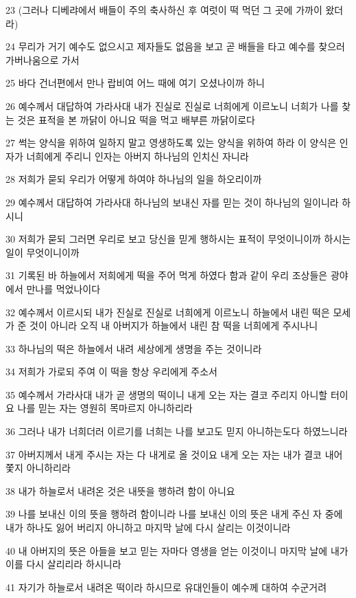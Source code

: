 \par 23 (그러나 디베랴에서 배들이 주의 축사하신 후 여럿이 떡 먹던 그 곳에 가까이 왔더라)
\par 24 무리가 거기 예수도 없으시고 제자들도 없음을 보고 곧 배들을 타고 예수를 찾으러 가버나움으로 가서
\par 25 바다 건너편에서 만나 랍비여 어느 때에 여기 오셨나이까 하니
\par 26 예수께서 대답하여 가라사대 내가 진실로 진실로 너희에게 이르노니 너희가 나를 찾는 것은 표적을 본 까닭이 아니요 떡을 먹고 배부른 까닭이로다
\par 27 썩는 양식을 위하여 일하지 말고 영생하도록 있는 양식을 위하여 하라 이 양식은 인자가 너희에게 주리니 인자는 아버지 하나님의 인치신 자니라
\par 28 저희가 묻되 우리가 어떻게 하여야 하나님의 일을 하오리이까
\par 29 예수께서 대답하여 가라사대 하나님의 보내신 자를 믿는 것이 하나님의 일이니라 하시니
\par 30 저희가 묻되 그러면 우리로 보고 당신을 믿게 행하시는 표적이 무엇이니이까 하시는 일이 무엇이니이까
\par 31 기록된 바 하늘에서 저희에게 떡을 주어 먹게 하였다 함과 같이 우리 조상들은 광야에서 만나를 먹었나이다
\par 32 예수께서 이르시되 내가 진실로 진실로 너희에게 이르노니 하늘에서 내린 떡은 모세가 준 것이 아니라 오직 내 아버지가 하늘에서 내린 참 떡을 너희에게 주시나니
\par 33 하나님의 떡은 하늘에서 내려 세상에게 생명을 주는 것이니라
\par 34 저희가 가로되 주여 이 떡을 항상 우리에게 주소서
\par 35 예수께서 가라사대 내가 곧 생명의 떡이니 내게 오는 자는 결코 주리지 아니할 터이요 나를 믿는 자는 영원히 목마르지 아니하리라
\par 36 그러나 내가 너희더러 이르기를 너희는 나를 보고도 믿지 아니하는도다 하였느니라
\par 37 아버지께서 내게 주시는 자는 다 내게로 올 것이요 내게 오는 자는 내가 결코 내어 쫓지 아니하리라
\par 38 내가 하늘로서 내려온 것은 내뜻을 행하려 함이 아니요
\par 39 나를 보내신 이의 뜻을 행하려 함이니라 나를 보내신 이의 뜻은 내게 주신 자 중에 내가 하나도 잃어 버리지 아니하고 마지막 날에 다시 살리는 이것이니라
\par 40 내 아버지의 뜻은 아들을 보고 믿는 자마다 영생을 얻는 이것이니 마지막 날에 내가 이를 다시 살리리라 하시니라
\par 41 자기가 하늘로서 내려온 떡이라 하시므로 유대인들이 예수께 대하여 수군거려
